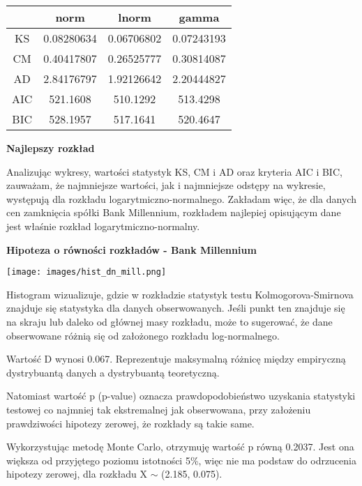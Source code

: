 \documentclass[12pt]{article}
\begin{document}
\begin{table}[h]
\centering
\begin{tabular}{|c|c|c|c|}
\hline
 & \textbf{norm} & \textbf{lnorm} & \textbf{gamma} \\
\hline
KS & 0.08280634 & 0.06706802 & 0.07243193 \\
CM & 0.40417807 & 0.26525777 & 0.30814087 \\
AD & 2.84176797 & 1.92126642 & 2.20444827 \\
\hline
AIC & 521.1608 & 510.1292 & 513.4298 \\
BIC & 528.1957 & 517.1641 & 520.4647 \\
\hline
\end{tabular}
\end{table}

{\bf \large Najlepszy rozkład}

Analizując wykresy, wartości statystyk KS, CM i AD oraz kryteria AIC i BIC, zauważam, że najmniejsze wartości, jak i najmniejsze odstępy na wykresie, występują dla rozkładu logarytmiczno-normalnego.
Zakładam więc, że dla danych cen zamknięcia spółki Bank Millennium, rozkładem najlepiej opisującym dane jest właśnie rozkład logarytmiczno-normalny.

\clearpage
{\bf \large Hipoteza o równości rozkładów - Bank Millennium}

\texttt{[image: images/hist\_dn\_mill.png]}

Histogram wizualizuje, gdzie w rozkładzie statystyk testu Kolmogorova-Smirnova znajduje się statystyka dla danych obserwowanych. Jeśli punkt ten znajduje się na skraju lub daleko od głównej masy rozkładu, może to sugerować, że dane obserwowane różnią się od założonego rozkładu log-normalnego.
\vspace{12pt}
\par
Wartość D wynosi 0.067. Reprezentuje maksymalną różnicę między empiryczną dystrybuantą danych a dystrybuantą teoretyczną.
\vspace{12pt}

Natomiast wartość p (p-value) oznacza prawdopodobieństwo uzyskania statystyki testowej co najmniej tak ekstremalnej jak obserwowana, przy założeniu prawdziwości hipotezy zerowej, że rozkłady są takie same.
\vspace{12pt}

Wykorzystując metodę Monte Carlo, otrzymuję wartość p równą 0.2037. Jest ona większa od przyjętego poziomu istotności 5\%, więc nie ma podstaw do odrzucenia hipotezy zerowej, dla rozkładu X $\sim$ (2.185, 0.075).
\end{document}
